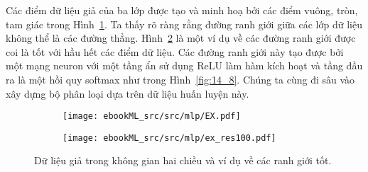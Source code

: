 
Các điểm dữ liệu giả của ba lớp được tạo và minh hoạ bởi các điểm vuông, tròn,
tam giác trong Hình~\ref{fig:14_7a}. Ta thấy rõ ràng rằng đường ranh giới giữa
các lớp dữ liệu không thể là các đường thẳng. Hình~\ref{fig:14_7b} là một ví dụ
về các đường ranh giới được coi là tốt với hầu hết các điểm dữ liệu. Các đường
ranh giới này tạo được bởi một mạng neuron với một tầng ẩn sử dụng ReLU làm hàm
kích hoạt và tầng đầu ra là một hồi quy softmax như trong Hình~\ref{fig:14_8}.
Chúng ta cùng đi sâu vào xây dựng bộ phân loại dựa trên dữ liệu huấn luyện này.%

\begin{figure}[t]
\begin{subfigure}{0.45\textwidth}
\texttt{[image: ebookML\_src/src/mlp/EX.pdf]}
\caption{}
\label{fig:14_7a}
\end{subfigure}
\begin{subfigure}{0.45\textwidth}
\texttt{[image: ebookML\_src/src/mlp/ex\_res100.pdf]}
\caption{}
\label{fig:14_7b}
\end{subfigure}
\caption{
Dữ liệu giả trong không gian hai chiều và ví dụ về các ranh giới tốt.
}
\label{fig:14_7}
\end{figure}


